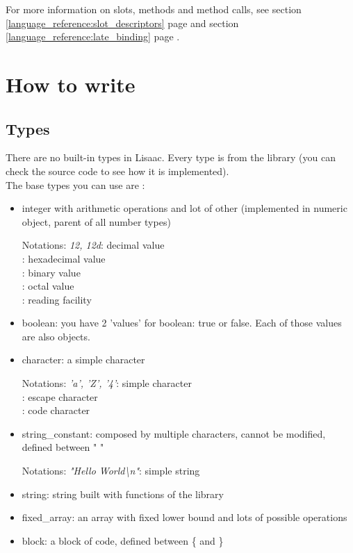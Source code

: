 \documentclass[11pt]{mybook}
\begin{document}
For more information on slots, methods and method calls, see 
section \ref{language_reference:slot_descriptors} page
\pageref{language_reference:slot_descriptors} and section \ref{language_reference:late_binding}
page \pageref{language_reference:late_binding}.

\section{How to write}
\label{quickstart:write}
%
\subsection{Types}
\label{quickstart:write:types}
There are no built-in types in Lisaac. Every type is from the library (you can check the source code to see how it is implemented).\\
The base types you can use are :
\begin{itemize}
\item{{\sc{}integer} with arithmetic operations and lot of other (implemented in {\sc{}numeric} object, parent of all number types)}
\begin{tabbing}
Notations: \={\it{}12, 12d}: decimal value\\
: hexadecimal value\\
: binary value\\
: octal value\\
: reading facility
\end{tabbing}
\item{{\sc{}boolean}: you have 2 'values' for {\sc{}boolean}: {\sc{}true} or {\sc{}false}. Each of those values are also objects.}
\item{{\sc{}character}: a simple character}
\begin{tabbing}
Notations: \={\it{}'a', 'Z', '4'}: simple character\\
: escape character\\
: code character
\end{tabbing}
\item{{\sc{}string\_constant}: composed by multiple characters, cannot be modified, defined between " "}
\begin{tabbing}
Notations: \={\it{}"Hello World\textbackslash n"}: simple string
\end{tabbing}
\item{{\sc{}string}: string built with functions of the library}
\item{{\sc{}fixed\_array}: an array with fixed lower bound and lots of possible operations}
\item{{\sc{}block}: a block of code, defined between \{ and \}}
\end{itemize}
\end{document}
